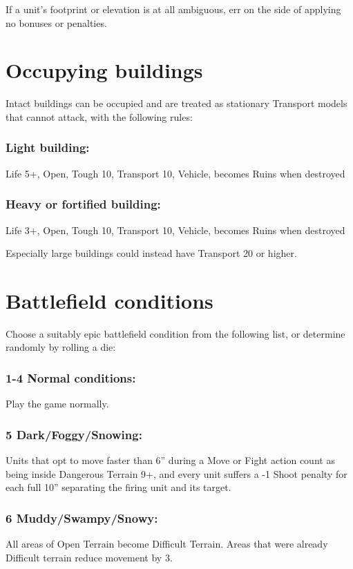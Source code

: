 \begin{multicols}{2}
If a unit's footprint or elevation is at all ambiguous, err on the side of applying no bonuses or penalties.




\section*{Occupying buildings}
Intact buildings can be occupied and are treated as stationary Transport models that cannot attack, with the following rules:

\subsubsection*{Light building:} Life 5+, Open, Tough 10, Transport 10, Vehicle, becomes Ruins when destroyed

\subsubsection*{Heavy or fortified building:} Life 3+, Open, Tough 10, Transport 10, Vehicle, becomes Ruins when destroyed

Especially large buildings could instead have Transport 20 or higher.




\section*{Battlefield conditions}
Choose a suitably epic battlefield condition from the following list, or determine randomly by rolling a die:

\subsubsection*{1-4 Normal conditions:} Play the game normally.

\subsubsection*{5 Dark/Foggy/Snowing:} Units that opt to move faster than 6'' during a Move or Fight action count as being inside Dangerous Terrain 9+, and every unit suffers a -1 Shoot penalty for each full 10'' separating the firing unit and its target.

\subsubsection*{6 Muddy/Swampy/Snowy:} All areas of Open Terrain become Difficult Terrain. Areas that were already Difficult terrain reduce movement by 3.


\end{multicols}
